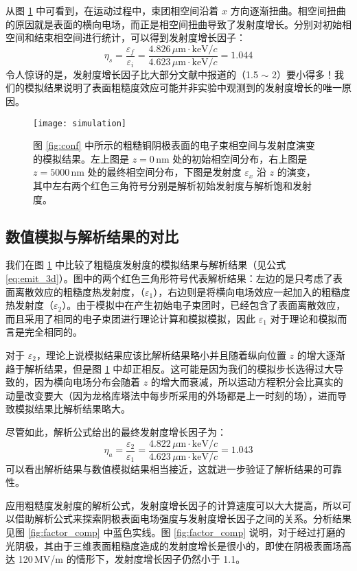 从图 \ref{fig:sim1} 中可看到，在运动过程中，束团相空间沿着 $x$ 方向逐渐扭曲。相空间扭曲的原因就是表面的横向电场，而正是相空间扭曲导致了发射度增长。分别对初始相空间和结束相空间进行统计，可以得到发射度增长因子：
\[
\eta_{s} = \frac{\varepsilon_f}{\varepsilon_i} = \frac{4.826\,\mu\text{m}\cdot\text{keV}/c}{4.623\,\mu\text{m}\cdot\text{keV}/c} = 1.044
\]
令人惊讶的是，发射度增长因子比大部分文献中报道的（1.5 $\sim$ 2）要小得多！我们的模拟结果说明了表面粗糙度效应可能并非实验中观测到的发射度增长的唯一原因。

\begin{figure}[htbp]
\centering
\texttt{[image: simulation]}
\caption{\label{fig:sim1} 
图 \ref{fig:conf} 中所示的粗糙铜阴极表面的电子束相空间与发射度演变的模拟结果。左上图是 $z=0\,\text{nm}$ 处的初始相空间分布，右上图是 $z=5000\,\text{nm}$ 处的最终相空间分布，下图是发射度 $\varepsilon_x$ 沿 $z$ 的演变，其中左右两个红色三角符号分别是解析初始发射度与解析饱和发射度。}
\end{figure}

\subsection{\label{ss:sim-res}数值模拟与解析结果的对比}
我们在图 \ref{fig:sim1} 中比较了粗糙度发射度的模拟结果与解析结果（见公式 \ref{eq:emit_3d}）。图中的两个红色三角形符号代表解析结果：左边的是只考虑了表面离散效应的粗糙度热发射度，（$\varepsilon_1$），右边则是将横向电场效应一起加入的粗糙度热发射度（$\varepsilon_2$）。由于模拟中在产生初始电子束团时，已经包含了表面离散效应，而且采用了相同的电子束团进行理论计算和模拟模拟，因此 $\varepsilon_1$ 对于理论和模拟而言是完全相同的。

对于 $\varepsilon_2$，理论上说模拟结果应该比解析结果略小并且随着纵向位置 $z$ 的增大逐渐趋于解析结果，但是图 \ref{fig:sim1} 中却正相反。这可能是因为我们的模拟步长选得过大导致的，因为横向电场分布会随着 $z$ 的增大而衰减，所以运动方程积分会比真实的动量改变要大（因为龙格库塔法中每步所采用的外场都是上一时刻的场），进而导致模拟结果比解析结果略大。

尽管如此，解析公式给出的最终发射度增长因子为：
\[
\eta_a = \frac{\varepsilon_2}{\varepsilon_1} = \frac{4.822\,\mu\text{m}\cdot\text{keV}/c}{4.623\,\mu\text{m}\cdot\text{keV}/c} = 1.043
\]
可以看出解析结果与数值模拟结果相当接近，这就进一步验证了解析结果的可靠性。

应用粗糙度发射度的解析公式，发射度增长因子的计算速度可以大大提高，所以可以借助解析公式来探索阴极表面电场强度与发射度增长因子之间的关系。分析结果见图 \ref{fig:factor_comp} 中蓝色实线。图 \ref{fig:factor_comp} 说明，对于经过打磨的光阴极，其由于三维表面粗糙度造成的发射度增长是很小的，即使在阴极表面场高达 120\,MV/m 的情形下，发射度增长因子仍然小于 1.1。

